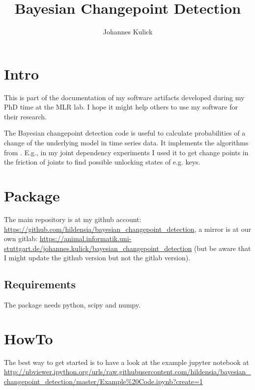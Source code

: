 \documentclass{article}
\author{Johannes Kulick}
\title{Bayesian Changepoint Detection}
\begin{document}
\maketitle

\section{Intro}
This is part of the documentation of my software artifacts developed during my
PhD time at the MLR lab. I hope it might help others to use my software for
their research.

The Bayesian changepoint detection code is useful to calculate probabilities of
a change of the underlying model in time series data. It implements the
algorithms from \textcite{fearnhead_exact_2006, adams_bayesian_2007}. E.g., in my joint
dependency \parencite{kulick_active_2015} experiments I used it to get change points in the
friction of joints to find possible unlocking states of e.g. keys.

\section{Package}

The main repository is at my github account:
\url{https://github.com/hildensia/bayesian_changepoint_detection}, a mirror is
  at our own gitlab:
  \url{https://animal.informatik.uni-stuttgart.de/johannes.kulick/bayesian_changepoint_detection}
  (but be aware that I might update the github version but not the gitlab
  version).

\subsection{Requirements}
The package needs python, scipy and numpy. 

\section{HowTo}
The best way to get started is to have a look at the example jupyter notebook at
\url{http://nbviewer.ipython.org/urls/raw.githubusercontent.com/hildensia/bayesian_changepoint_detection/master/Example%20Code.ipynb?create=1}


\printbibliography[heading=bibintoc]
\end{document}
